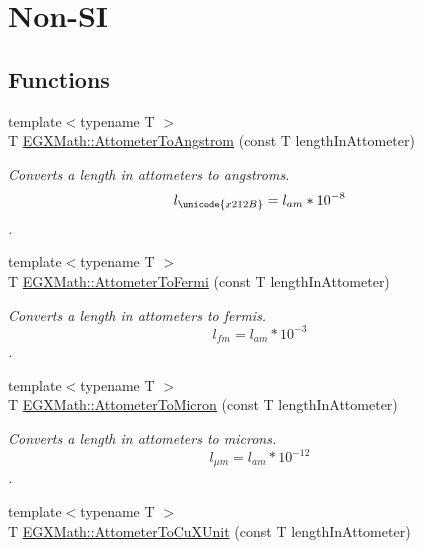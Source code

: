\hypertarget{group___e_g_x_math-_conversions-_length_conversions-_attometer-_non-_s_i}{}\section{Non-\/\+SI}
\label{group___e_g_x_math-_conversions-_length_conversions-_attometer-_non-_s_i}
\subsection*{Functions}
\begin{DoxyCompactItemize}
\item 
{\footnotesize template$<$typename T $>$ }\\T \mbox{\hyperlink{group___e_g_x_math-_conversions-_length_conversions-_attometer-_non-_s_i_ga331ff6e8159f6f00bb7a20e39fa4d756}{E\+G\+X\+Math\+::\+Attometer\+To\+Angstrom}} (const T length\+In\+Attometer)
\begin{DoxyCompactList}\small\item\em Converts a length in attometers to angstroms. \[ l_{\unicode{x212B}}=l_{am} * 10^{-8} \]. \end{DoxyCompactList}\item 
{\footnotesize template$<$typename T $>$ }\\T \mbox{\hyperlink{group___e_g_x_math-_conversions-_length_conversions-_attometer-_non-_s_i_ga7dc342fa730e646b020d60aa6c2848ef}{E\+G\+X\+Math\+::\+Attometer\+To\+Fermi}} (const T length\+In\+Attometer)
\begin{DoxyCompactList}\small\item\em Converts a length in attometers to fermis. \[ l_{fm}=l_{am} * 10^{-3} \]. \end{DoxyCompactList}\item 
{\footnotesize template$<$typename T $>$ }\\T \mbox{\hyperlink{group___e_g_x_math-_conversions-_length_conversions-_attometer-_non-_s_i_ga9aaf945221fbc8d469121e0fd0980b41}{E\+G\+X\+Math\+::\+Attometer\+To\+Micron}} (const T length\+In\+Attometer)
\begin{DoxyCompactList}\small\item\em Converts a length in attometers to microns. \[ l_{\mu m}=l_{am} * 10^{-12} \]. \end{DoxyCompactList}\item 
{\footnotesize template$<$typename T $>$ }\\T \mbox{\hyperlink{group___e_g_x_math-_conversions-_length_conversions-_attometer-_non-_s_i_gabd388c2e0821ac9066b4fb87e35402b1}{E\+G\+X\+Math\+::\+Attometer\+To\+Cu\+X\+Unit}} (const T length\+In\+Attometer)

\end{DoxyCompactItemize}
